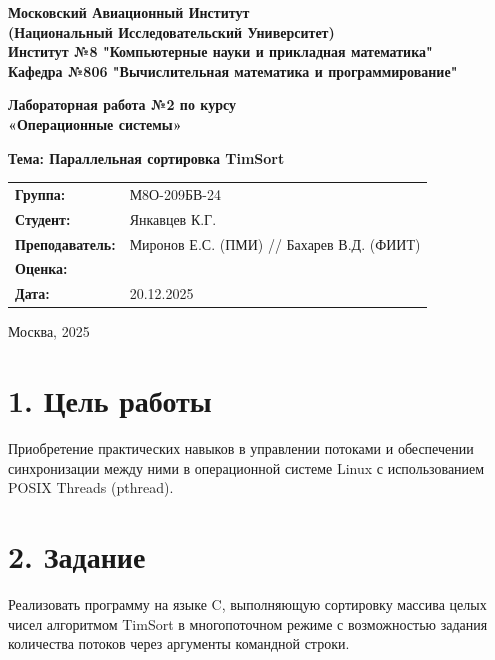 \documentclass[12pt,a4paper]{article}
\begin{document}
\begin{center}
    \textbf{Московский Авиационный Институт} \\
    \textbf{(Национальный Исследовательский Университет)} \\
    \textbf{Институт №8 "Компьютерные науки и прикладная математика"} \\
    \textbf{Кафедра №806 "Вычислительная математика и программирование"} \\
    
    \vspace{1cm}
    
    \textbf{Лабораторная работа №2 по курсу} \\
    \textbf{«Операционные системы»} \\
    
    \vspace{1.5cm}
    
    \textbf{Тема: Параллельная сортировка TimSort} \\
    
    \vspace{2cm}
    
    \begin{tabular}{ll}
        \textbf{Группа:} & М8О-209БВ-24 \\
        \textbf{Студент:} & Янкавцев К.Г. \\
        \textbf{Преподаватель:} & Миронов Е.С. (ПМИ) // Бахарев В.Д. (ФИИТ) \\
        \textbf{Оценка:} & \underline{\hspace{3cm}} \\
        \textbf{Дата:} & 20.12.2025 \\
    \end{tabular}
    
    \vspace{2cm}
    
    Москва, 2025
\end{center}

\newpage

\section*{1. Цель работы}
Приобретение практических навыков в управлении потоками и обеспечении синхронизации между ними в операционной системе Linux с использованием POSIX Threads (pthread).

\section*{2. Задание}
Реализовать программу на языке C, выполняющую сортировку массива целых чисел алгоритмом TimSort в многопоточном режиме с возможностью задания количества потоков через аргументы командной строки.
\end{document}
